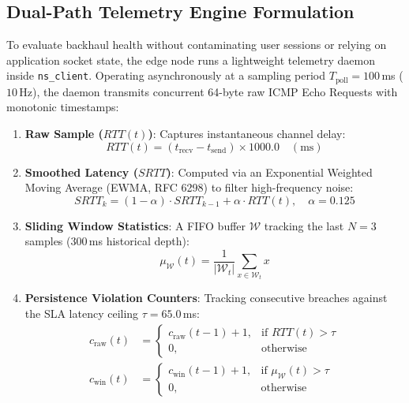 \documentclass[conference]{IEEEtran}
\begin{document}
{\subsection{Dual-Path Telemetry Engine Formulation}
To evaluate backhaul health without contaminating user sessions or relying on application socket state, the edge node runs a lightweight telemetry daemon inside \texttt{ns\_client}. Operating asynchronously at a sampling period $T_{\text{poll}} = 100$\,ms ($10$\,Hz), the daemon transmits concurrent 64-byte raw ICMP Echo Requests with monotonic timestamps:
\begin{enumerate}
    \item \textbf{Raw Sample ($RTT(t)$)}: Captures instantaneous channel delay:
    \begin{equation}
    RTT(t) = (t_{\text{recv}} - t_{\text{send}}) \times 1000.0 \quad (\text{ms})
    \end{equation}
    \item \textbf{Smoothed Latency ($SRTT$)}: Computed via an Exponential Weighted Moving Average (EWMA, RFC 6298) to filter high-frequency noise:
    \begin{equation}
    SRTT_k = (1 - \alpha) \cdot SRTT_{k-1} + \alpha \cdot RTT(t), \quad \alpha = 0.125
    \end{equation}
    \item \textbf{Sliding Window Statistics}: A FIFO buffer $\mathcal{W}$ tracking the last $N = 3$ samples ($300$\,ms historical depth):
    \begin{equation}
    \mu_{\mathcal{W}}(t) = \frac{1}{|\mathcal{W}_t|} \sum_{x \in \mathcal{W}_t} x
    \end{equation}
    \item \textbf{Persistence Violation Counters}: Tracking consecutive breaches against the SLA latency ceiling $\tau = 65.0$\,ms:
    \begin{align}
    c_{\text{raw}}(t) &= 
    \begin{cases}
    c_{\text{raw}}(t-1) + 1, & \text{if } RTT(t) > \tau \\
    0, & \text{otherwise}
    \end{cases} \\
    c_{\text{win}}(t) &= 
    \begin{cases}
    c_{\text{win}}(t-1) + 1, & \text{if } \mu_{\mathcal{W}}(t) > \tau \\
    0, & \text{otherwise}
    \end{cases}
    \end{align}
\end{enumerate}
}
\end{document}
